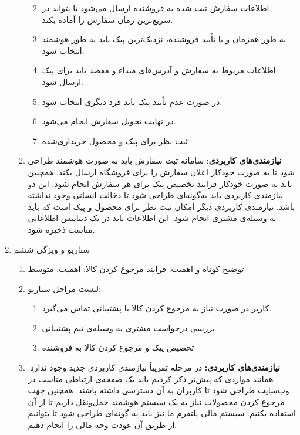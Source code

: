 \documentclass[]{article}
\begin{document}
\begin{enumerate}
\begin{enumerate}
    \begin{enumerate}
    \def\labelenumiii{\arabic{enumiii}.}
    \item
      اطلاعات سفارش ثبت شده به فروشنده ارسال می‌شود تا بتواند در
      سریع‌ترین زمان سفارش را آماده بکند.
    \item
      به طور همزمان و با تأیید فروشنده، نزدیک‌ترین پیک باید به طور
      هوشمند انتخاب شود.
    \item
      اطلاعات مربوط به سفارش و آدرس‌های مبداء و مقصد باید برای پیک ارسال
      شود.
    \item
      در صورت عدم تأیید پیک باید فرد دیگری انتخاب شود.
    \item
      در نهایت تحویل سفارش انجام می‌شود.
    \item
      ثبت نظر برای پیک و محصول خریداری‌شده
    \end{enumerate}
  \item
    \textbf{نیازمندی‌های کاربردی}: سامانه ثبت سفارش باید به صورت هوشمند
    طراحی شود تا به صورت خودکار اعلان سفارش را برای فروشگاه ارسال بکند.
    همچنین باید به صورت خودکار فرایند تخصیص پیک برای هر سفارش انجام شود.
    این دو نیازمندی کاربردی باید به‌گونه‌ای طراحی شود تا دخالت انسانی
    وجود نداشته باشد. نیازمندی کاربردی دیگر امکان ثبت نظر برای محصول و
    پیک است که باید به وسیله‌ی مشتری انجام شود. این اطلاعات باید در یک
    دیتابیس اطلاعاتی مناسب ذخیره شود.
  \end{enumerate}
\item
  سناریو و ویژگی ششم

  \begin{enumerate}
  \def\labelenumii{\arabic{enumii}.}
  \item
    توضیح کوتاه و اهمیت: فرایند مرجوع کردن کالا: اهمیت: متوسط
  \item
    لیست مراحل سناریو:

    \begin{enumerate}
    \def\labelenumiii{\arabic{enumiii}.}
    \item
      کاربر در صورت نیاز به مرجوع کردن کالا با پشتیبانی تماس می‌گیرد.
    \item
      بررسی درخواست مشتری به وسیله‌ی تیم پشتیبانی
    \item
      تخصیص پیک و مرجوع کردن کالا به فروشنده
    \end{enumerate}
  \item
    \textbf{نیازمندی‌های کاربردی:} در مرحله تقریباً نیازمندی کاربردی
    جدید وجود ندارد. همانند مواردی که پیش‌تر ذکر کردیم باید یک صفحه‌ی
    ارتباطی مناسب در وب‌سایت طراحی شود تا کاربران به آن دسترسی داشته
    باشند. همچنین جهت مرجوع کردن محصولات نیاز به یک سیستم هوشمند
    حمل‌ونقل داریم تا از آن استفاده بکنیم. سیستم مالی پلتفرم ما نیز باید
    به گونه‌ای طراحی شود تا بتوانیم از طریق آن عودت وجه مالی را انجام
    دهیم.
  \end{enumerate}
\end{enumerate}
\end{document}
